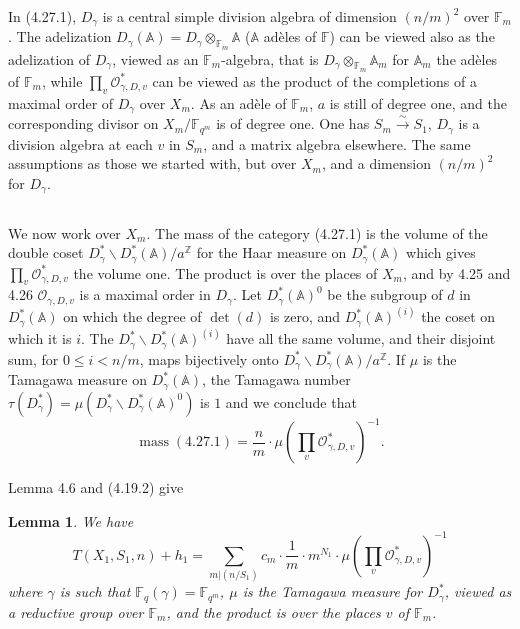 \documentclass[11pt,a4paper]{article}
\theoremstyle{plain}
\newtheorem{lemma}[theorem]{Lemma}
\theoremstyle{definition}
\DeclareMathOperator{\mass}{mass}
\newcommand{\F}{\mathbb{F}}
\newcommand{\Z}{\mathbb{Z}}
\begin{document}
In (4.27.1), $D_\gamma$ is a central simple division algebra of dimension $(n/m)^2$ over $\mathbb{F}_m$. The adelization $D_\gamma(\mathbb{A}) = D_\gamma \otimes_{\mathbb{F}_m} \mathbb{A}$ ($\mathbb{A}$ ad\`eles of $\mathbb{F}$) can be viewed also as the adelization of $D_\gamma$, viewed as an $\mathbb{F}_m$-algebra, that is $D_\gamma \otimes_{\mathbb{F}_m} \mathbb{A}_m$ for $\mathbb{A}_m$ the ad\`eles of $\mathbb{F}_m$, while $\prod_v \mathcal{O}_{\gamma,D,v}^*$ can be viewed as the product of the completions of a maximal order of $D_\gamma$ over $X_m$. As an ad\`ele of $\mathbb{F}_m$, $a$ is still of degree one, and the corresponding divisor on $X_m/\F_{q^m}$ is of degree one. One has $S_m \xrightarrow{\sim} S_1$, $D_\gamma$ is a division algebra at each $v$ in $S_m$, and a matrix algebra elsewhere. The same assumptions as those we started with, but over $X_m$, and a dimension $(n/m)^2$ for $D_\gamma$.

\subsection{}

We now work over $X_m$. The mass of the category (4.27.1) is the volume of the double coset $D_\gamma^* \backslash D_\gamma^*(\mathbb{A}) / a^{\Z}$ for the Haar measure on $D_\gamma^*(\mathbb{A})$ which gives $\prod_v \mathcal{O}_{\gamma,D,v}^*$ the volume one. The product is over the places of $X_m$, and by 4.25 and 4.26 $\mathcal{O}_{\gamma,D,v}$ is a maximal order in $D_\gamma$. Let $D_\gamma^*(\mathbb{A})^0$ be the subgroup of $d$ in $D_\gamma^*(\mathbb{A})$ on which the degree of $\det(d)$ is zero, and $D_\gamma^*(\mathbb{A})^{(i)}$ the coset on which it is $i$. The $D_\gamma^* \backslash D_\gamma^*(\mathbb{A})^{(i)}$ have all the same volume, and their disjoint sum, for $0 \leq i < n/m$, maps bijectively onto $D_\gamma^* \backslash D_\gamma^*(\mathbb{A}) / a^{\Z}$. If $\mu$ is the Tamagawa measure on $D_\gamma^*(\mathbb{A})$, the Tamagawa number $\tau(D_\gamma^*) = \mu(D_\gamma^* \backslash D_\gamma^*(\mathbb{A})^0)$ is $1$ and we conclude that
\begin{equation}
\mass(\text{4.27.1}) = \frac{n}{m} \cdot \mu\left(\prod_v \mathcal{O}_{\gamma,D,v}^*\right)^{-1}. \tag{4.28.1}
\end{equation}

Lemma 4.6 and (4.19.2) give

\begin{lemma}
We have
\[
T(X_1, S_1, n) + h_1 = \sum_{m | (n/S_1)} c_m \cdot \frac{1}{m} \cdot m^{N_1} \cdot \mu\left(\prod_v \mathcal{O}_{\gamma,D,v}^*\right)^{-1}
\]
where $\gamma$ is such that $\F_q(\gamma) = \F_{q^m}$, $\mu$ is the Tamagawa measure for $D_\gamma^*$, viewed as a reductive group over $\mathbb{F}_m$, and the product is over the places $v$ of $\mathbb{F}_m$.
\end{lemma}
\end{document}
